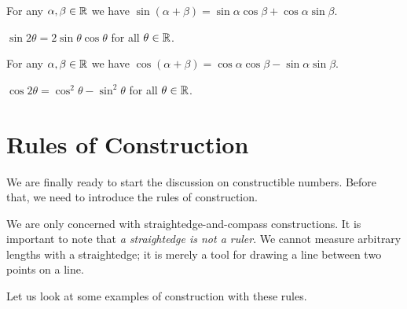 \begin{theorem}
    For any $\alpha,\beta \in \mathbb{R}$ we have $\sin(\alpha+\beta) = \sin\alpha\cos\beta + \cos\alpha\sin\beta$.
\end{theorem}
\begin{corollary}
    $\sin2\theta = 2\sin\theta\cos\theta$ for all $\theta \in \mathbb{R}$.
\end{corollary}

\begin{theorem}
    For any $\alpha,\beta \in \mathbb{R}$ we have $\cos(\alpha+\beta) = \cos\alpha\cos\beta - \sin\alpha\sin\beta$.
\end{theorem}
\begin{corollary}
    $\cos2\theta = \cos^2\theta - \sin^2\theta$ for all $\theta \in \mathbb{R}$.
\end{corollary}

\section{Rules of Construction}
We are finally ready to start the discussion on constructible numbers. Before that, we need to introduce the rules of construction.

We are only concerned with straightedge-and-compass constructions. It is important to note that \textit{a straightedge is not a ruler}. We cannot measure arbitrary lengths with a straightedge; it is merely a tool for drawing a line between two points on a line.

Let us look at some examples of construction with these rules.

